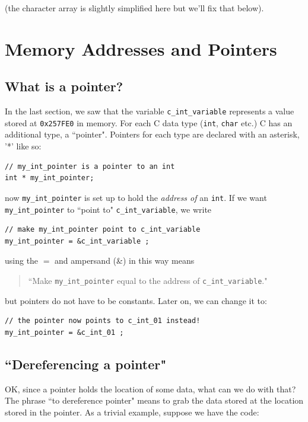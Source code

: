 \documentclass{article}	%
\begin{document}
(the character array is slightly simplified here but we'll fix that below).





\section{Memory Addresses and Pointers}
\subsection{What is a pointer?}
In the last section, we saw that the variable {\tt c\_int\_variable} 
represents a value stored at {\tt 0x257FE0} in memory.   For each 
C data type ({\tt int}, {\tt char} etc.) C has an additional type,
a ``pointer".  Pointers for each type are declared with an asterisk, '*'
like so:
\begin{verbatim}
// my_int_pointer is a pointer to an int
int * my_int_pointer; 
\end{verbatim}
now {\tt my\_int\_pointer} is set up to hold the {\it address of} an {\tt int}.
If we want {\tt my\_int\_pointer} to ``point to" {\tt c\_int\_variable}, we write


\begin{verbatim}
// make my_int_pointer point to c_int_variable
my_int_pointer = &c_int_variable ;  
\end{verbatim}
using the $=$ and ampersand (\&) in this way means 
\begin{quotation} 
   ``Make {\tt my\_int\_pointer} equal to the address of {\tt c\_int\_variable}."
\end{quotation}
but pointers do not have to be constants.   Later on, we can change it to:

\begin{verbatim}
// the pointer now points to c_int_01 instead!
my_int_pointer = &c_int_01 ;  
\end{verbatim}




\subsection{``Dereferencing a pointer"}
OK, since a pointer holds the location of some data, what can we do with that?   The phrase 
``to dereference pointer" means to grab the data stored at the location stored in the pointer. 
As a trivial example, suppose we have the code:
\end{document}
